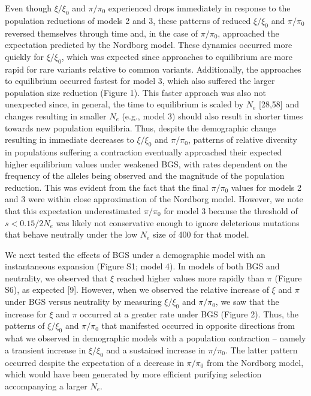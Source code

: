 \documentclass[9pt,twocolumn,twoside]{rilabRxiv}
\begin{document}
Even though $\xi/\xi_0$ and $\pi/\pi_0$ experienced
drops immediately in response to the population reductions of models 2
and 3, these patterns of reduced $\xi/\xi_0$ and
$\pi/\pi_0$ reversed themselves through time and, in the case
of $\pi/\pi_0$, approached the expectation predicted by the
Nordborg model. These dynamics occurred more quickly for
$\xi/\xi_0$, which was expected since approaches to equilibrium
are more rapid for rare variants relative to common variants.
Additionally, the approaches to equilibrium occurred fastest for model
3, which also suffered the larger population size reduction (Figure 1).
This faster approach was also not unexpected since, in general, the time
to equilibrium is scaled by $N_e$ [28,58] and
changes resulting in smaller $N_e$ (e.g., model 3)
should also result in shorter times towards new population equilibria.
Thus, despite the demographic change resulting in immediate decreases to
$\xi/\xi_0$ and $\pi/\pi_0$, patterns of relative
diversity in populations suffering a contraction eventually approached
their expected higher equilibrium values under weakened BGS, with rates
dependent on the frequency of the alleles being observed and the
magnitude of the population reduction. This was evident from the fact
that the final $\pi/\pi_0$ values for models 2 and 3 were
within close approximation of the Nordborg model. However, we note that
this expectation underestimated $\pi/\pi_0$ for model 3 because
the threshold of $s < 0.15/2N_e$
was likely not conservative enough to ignore deleterious mutations that
behave neutrally under the low $N_e$ size of 400 for
that model.

We next tested the effects of BGS under a demographic model with an
instantaneous expansion (Figure S1; model 4). In models of both BGS and
neutrality, we observed that $\xi$ reached higher values more rapidly than $\pi$
(Figure S6), as expected [9]. However, when we observed the relative
increase of $\xi$ and $\pi$ under BGS versus neutrality by measuring
$\xi/\xi_0$ and $\pi/\pi_0$, we saw that the increase
for $\xi$ and $\pi$ occurred at a greater rate under BGS (Figure 2). Thus, the
patterns of $\xi/\xi_0$ and $\pi/\pi_0$ that
manifested occurred in opposite directions from what we observed in
demographic models with a population contraction -- namely a transient
increase in $\xi/\xi_0$ and a sustained increase in
$\pi/\pi_0$. The latter pattern occurred despite the
expectation of a decrease in $\pi/\pi_0$ from the Nordborg
model, which would have been generated by more efficient purifying
selection accompanying a larger $N_e$.
\end{document}

